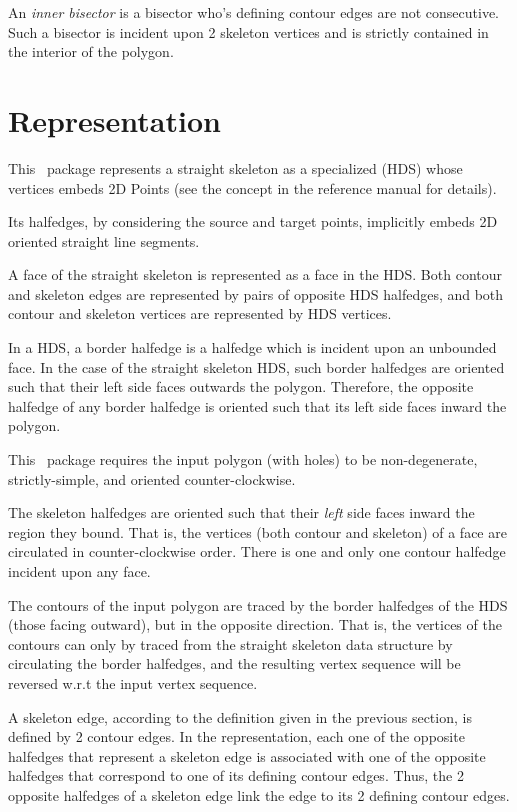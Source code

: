 An {\em inner bisector} is a bisector who's defining contour edges are
not consecutive. Such a bisector is incident upon 2 skeleton vertices
and is strictly contained in the interior of the polygon.

\section{Representation}

This \cgal\ package represents a straight skeleton as a specialized  (HDS) whose vertices embeds 2D Points (see the  concept in the reference manual for details).

Its halfedges, by considering the source and target points, implicitly embeds 2D oriented straight line segments. 

A face of the straight skeleton is represented as a face in the
HDS. Both contour and skeleton edges are represented by pairs of
opposite HDS halfedges, and both contour and skeleton vertices are
represented by HDS vertices.

In a HDS, a border halfedge is a halfedge which is incident upon an
unbounded face. In the case of the straight skeleton HDS, such border
halfedges are oriented such that their left side faces outwards the
polygon. Therefore, the opposite halfedge of any border halfedge is
oriented such that its left side faces inward the polygon.

This \cgal\ package requires the input polygon (with holes) to be non-degenerate,
strictly-simple, and oriented counter-clockwise.

The skeleton halfedges are oriented such that their \textit{left} side faces
inward the region they bound. That is, the vertices (both contour and
skeleton) of a face are circulated in counter-clockwise order. There
is one and only one contour halfedge incident upon any face.

The contours of the input polygon are traced by the border halfedges 
of the HDS (those facing outward), but in the opposite direction. That 
is, the vertices of the contours can only by traced from the straight
skeleton data structure by circulating the border halfedges,
and the resulting vertex sequence will be reversed w.r.t 
the input vertex sequence.

A skeleton edge, according to the definition given in the previous
section, is defined by 2 contour edges. In the representation, each
one of the opposite halfedges that represent a skeleton edge is
associated with one of the opposite halfedges that correspond to one
of its defining contour edges. Thus, the 2 opposite halfedges of a
skeleton edge link the edge to its 2 defining contour edges.

